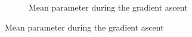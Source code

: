 \documentclass[a4paper, 11pt]{scrartcl}
\begin{document}
\begin{figure}[h]
\begin{subfigure}{.5\textwidth}
  \caption{Mean parameter during the gradient ascent}
  \label{fig:sub4}
\end{subfigure}%
\end{figure}
\end{document}
